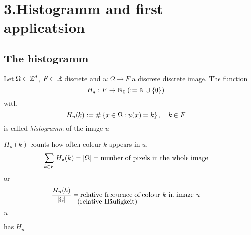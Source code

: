 \chapter{3.Histogramm and first applicatsion}
\section{The histogramm}
%
%
\begin{definition}[histogram]
	Let $\Omega \subset \mathbb{Z}^d$, $F\subset \mathbb{R}$ discrete and 
 	$u: \Omega \to F$ a discrete discrete image. 
 	The function 
 		$$ H_u : F \to \mathbb{N}_0 \; (:= \mathbb{N} \cup \left\{0\right\})$$
 	with 
	$$ H_u (k) := \# \left\{ x\in \Omega: 
		u(x) = k\right\}, \quad k\in F$$
	is called \emph{histogramm} of the image $u$.
\end{definition}

%
%
$H_u(k)$ counts how often colour $k$ appears in $u$.
%
	$$ \sum_{k\in F} H_u (k) = |\Omega| 
		= \hbox{number of pixels in the whole  image}$$
or
%
	$$ {H_u(k) \over |\Omega|} = 
		\hbox{relative frequence$%
			_{\lower0.84em\hbox{\hskip-8.1em (relative Häufigkeit)}}$ 
				 \hskip-.8em \hbox{of colour $k$ in image $u$}} $$

%
%
\newcommand{\pikA}{%
	\begin{minipage}{0.14\linewidth}
		\tikzpictureQNINEONE
	\end{minipage}%
}
\newcommand{\pikB}{%
	\begin{minipage}{0.35\linewidth}
		\tikzpictureQNINETWO
	\end{minipage}%
}

\begin{bsp}
	$u =$ \pikA has $H_n =$ \pikB  
\end{bsp}


